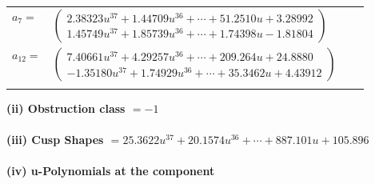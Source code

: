 \documentclass[1p]{elsarticle_modified}
\theoremstyle{definition}
\begin{document}
\begin{tabular}{m{7pt} m{180pt} m{7pt} m{180pt} }
\flushright $a_{7}=$&$\begin{pmatrix}2.38323 u^{37}+1.44709 u^{36}+\cdots+51.2510 u+3.28992\\1.45749 u^{37}+1.85739 u^{36}+\cdots+1.74398 u-1.81804\end{pmatrix}$ \\
\flushright $a_{12}=$&$\begin{pmatrix}7.40661 u^{37}+4.29257 u^{36}+\cdots+209.264 u+24.8880\\-1.35180 u^{37}+1.74929 u^{36}+\cdots+35.3462 u+4.43912\end{pmatrix}$\\&\end{tabular}
\flushleft \textbf{(ii) Obstruction class $= -1$}\\~\\
\flushleft \textbf{(iii) Cusp Shapes $= 25.3622 u^{37}+20.1574 u^{36}+\cdots+887.101 u+105.896$}\\~\\
\newpage\renewcommand{\arraystretch}{1}
\flushleft \textbf{(iv) u-Polynomials at the component}\newline \\
\end{document}
